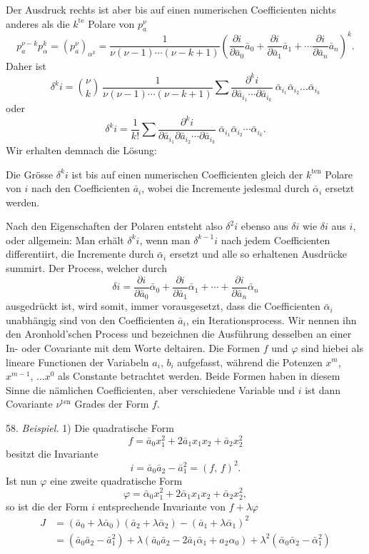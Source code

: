 Der Ausdruck rechts ist aber bis auf einen numerischen Coefficienten
nichts anderes als die $k^{\text{te}}$ Polare von $p_a^\nu$
\[
p_a^{\nu-k}p_\alpha^k = (p_a^\nu)_{\alpha^k} = \frac{1}{\nu(\nu-1)\cdots(\nu-k+1)}\left(\frac{\partial i}{\partial \bar a_0}\bar a_0+\frac{\partial i}{\partial \bar a_1}\bar a_1+\cdots\frac{\partial i}{\partial \bar a_n}\bar a_n\right)^k.
\]
Daher ist
\[
\delta^k i = \binom{\nu}{k}\ \frac{1}{\nu(\nu-1)\cdots(\nu-k+1)}\sum\frac{\partial^k i}{\partial\bar a_{i_1}\cdots\partial\bar a_{i_k}}\ \bar\alpha_{i_1}\bar\alpha_{i_2}\ldots\bar\alpha_{i_k}
\]
oder
\[
\delta^k i = \frac{1}{k!}\sum\frac{\partial^k i}{\partial\bar a_{i_1}\partial\bar a_{i_2}\cdots\partial\bar a_{i_k}}\ \bar\alpha_{i_1}\bar\alpha_{i_2}\cdots\bar\alpha_{i_k}. \tag{II}
\]
Wir erhalten demnach die Lösung:

\glqq Die Grösse $\delta^k i$ ist bis auf einen numerischen Coefficienten
gleich der $k^{\text{ten}}$ Polare von $i$ nach den Coefficienten $\bar a_i$, wobei
die Incremente jedesmal durch $\bar\alpha_i$ ersetzt werden.\grqq{}

Nach den Eigenschaften der Polaren entsteht also $\delta^2 i$ ebenso aus
$\delta i$ wie $\delta i$ aus $i$, oder allgemein: Man erhält $\delta^k i$, wenn man $\delta^{k-1}i$ nach
jedem Coefficienten differentiirt, die Incremente durch $\bar\alpha_i$ ersetzt und
alle so erhaltenen Ausdrücke summirt. Der Process, welcher durch
\[
\delta i = \frac{\partial i}{\partial \bar a_0}\bar\alpha_0 + \frac{\partial i}{\partial \bar a_1}\bar\alpha_1 + \cdots + \frac{\partial i}{\partial \bar a_n}\bar\alpha_n
\]
ausgedrückt ist, wird somit, immer vorausgesetzt, dass die Coefficienten $\bar\alpha_i$
unabhängig sind von den Coefficienten $\bar a_i$, ein Iterationsprocess. Wir
nennen ihn den Aronhold'schen Process und bezeichnen die Aus\-führung desselben an einer In- oder Covariante mit dem Worte \glqq del\-tairen\grqq{}. Die Formen $f$ und $\varphi$ sind hiebei als lineare Functionen der
Variabeln $a_i$, $b_i$ aufgefasst, während die Potenzen $x^m$, $x^{m-1}$, $\ldots x^0$
als Constante betrachtet werden. Beide Formen haben in diesem
Sinne die nämlichen Coefficienten, aber verschiedene Variable und $i$
ist dann Covariante $\nu^{\text{ten}}$ Grades der Form $f$.

58. \textit{Beispiel.} 1) Die quadratische Form
\[
f = \bar a_0 x_1^2 + 2\bar a_1 x_1 x_2 + \bar a_2 x_2^2
\]
besitzt die Invariante
\[
i = \bar a_0 \bar a_2 - \bar a_1^2 = (f,\,f)^2.
\]
Ist nun $\varphi$ eine zweite quadratische Form
\[
\varphi = \bar\alpha_0 x_1^2 + 2\bar\alpha_1 x_1 x_2 + \bar\alpha_2 x_2^2,
\]
so ist die der Form $i$ entsprechende Invariante von $f+\lambda\varphi$
\[
\begin{aligned}
J &= (\bar a_0+\lambda\bar\alpha_0)(\bar a_2+\lambda\bar\alpha_2)-(\bar a_1+\lambda\bar\alpha_1)^2\\
&= (\bar a_0\bar a_2-\bar a_1^2) + \lambda(\bar a_0\bar a_2-2\bar a_1\bar\alpha_1+a_2\alpha_0) + \lambda^2(\bar\alpha_0\bar\alpha_2-\bar\alpha_1^2) %
\end{aligned}
\]


